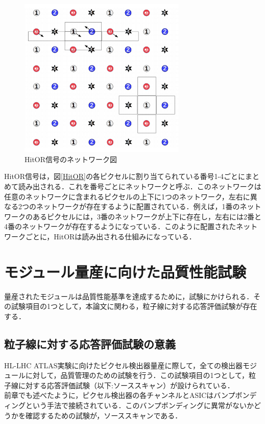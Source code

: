 \begin{figure}[h]
\centering
\includegraphics[width=8cm]{./figure/HitOR.png}
\caption{HitOR信号のネットワーク図}
\label{fig:HitOR}
\end{figure}

HitOR信号は，図\ref{HitOR}の各ピクセルに割り当てられている番号1-4ごとにまとめて読み出される．これを番号ごとにネットワークと呼ぶ．このネットワークは任意のネットワークに含まれるピクセルの上下に1つのネットワーク，左右に異なる2つのネットワークが存在するように配置されている．例えば，1番のネットワークのあるピクセルには，3番のネットワークが上下に存在し，左右には2番と4番のネットワークが存在するようになっている．このように配置されたネットワークごとに，HitORは読み出される仕組みになっている．

\section{モジュール量産に向けた品質性能試験}
量産されたモジュールは品質性能基準を達成するために，試験にかけられる．その試験項目の1つとして，本論文に関わる，粒子線に対する応答評価試験が存在する．

\subsection{粒子線に対する応答評価試験の意義}
HL-LHC ATLAS実験に向けたピクセル検出器量産に際して，全ての検出器モジュールに対して，品質管理のための試験を行う．この試験項目の1つとして，粒子線に対する応答評価試験（以下:ソーススキャン）が設けられている．\\
前章でも述べたように，ピクセル検出器の各チャンネルとASICはバンプボンディングという手法で接続されている．このバンプボンディングに異常がないかどうかを確認するための試験が，ソーススキャンである．\\

